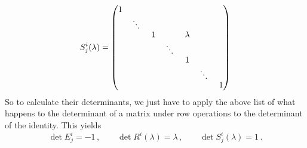 {\[
S^i_j(\lambda) = \begin{pmatrix}
1 & 	& 	& 	& & & 	\\
  & \rotatebox{-15}{$\ddots$} & 	&	& & &	\\
  & 	& 1 	& 	& \lambda & &	\\
  & 	& 	& \rotatebox{-15}{$\ddots$} & & &	\\
  & 	& 	& 	& 1 & & 	\\
  & 	& 	& 	& 	& \rotatebox{-15}{$\ddots$}& 	\\
  & 	& 	& 	& 	& 	 & 1	\\
\end{pmatrix}
\]
So to calculate their determinants, we just have to apply the above list of what happens to the determinant of a matrix under row operations to the determinant of the identity. This yields
\[
\det E^i_j=-1\, ,\qquad
\det R^i(\lambda)=\lambda\, ,\qquad
\det S^i_j(\lambda)=1\, .
\]


} %

